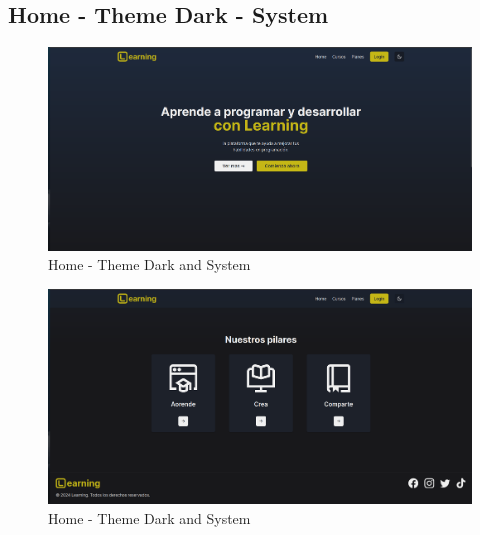 \subsection{Home - Theme Dark - System}
  \begin{figure}[H]
    \centering
    \includegraphics[width=1.0\textwidth]{img/H-DS.png}
    \caption{Home - Theme Dark and System}
  \end{figure}
  \begin{figure}[H]
    \centering
    \includegraphics[width=1.0\textwidth]{img/H-DS2.png}
    \caption{Home - Theme Dark and System}
  \end{figure}
